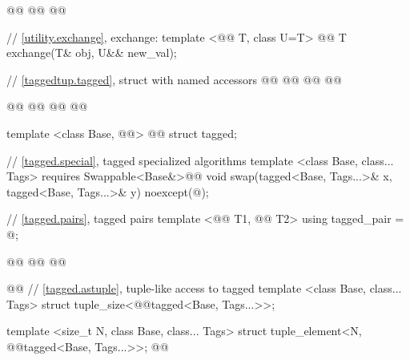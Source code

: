 \begin{codeblock}
@@
  @@
  @@

  // \ref{utility.exchange}, exchange:
  template <@@ T, class U=T>
    @@
  T exchange(T& obj, U&& new_val);
\end{codeblock}
{\color{addclr}
\begin{codeblock}
  // \ref{taggedtup.tagged}, struct with named accessors
  @@
  @@
    @@
  @\newtxt{\}}@

  @@
  @@
    @@
  @\newtxt{\}}@

  template <class Base, @@>
    @@
  struct tagged;

  // \ref{tagged.special}, tagged specialized algorithms
  template <class Base, class... Tags>
    requires Swappable<Base&>@\newtxt{()}@
  void swap(tagged<Base, Tags...>& x, tagged<Base, Tags...>& y) noexcept(@\seebelow@);

  // \ref{tagged.pairs}, tagged pairs
  template <@@ T1, @@ T2> using tagged_pair = @\seebelow@;

  @@
  @@
@\newtxt{\}\}\}}@

@@
  // \ref{tagged.astuple}, tuple-like access to tagged
  template <class Base, class... Tags>
  struct tuple_size<@@tagged<Base, Tags...>>;
  
  template <size_t N, class Base, class... Tags>
  struct tuple_element<N, @@tagged<Base, Tags...>>;
@\newtxt{\}}@
\end{codeblock}
}

